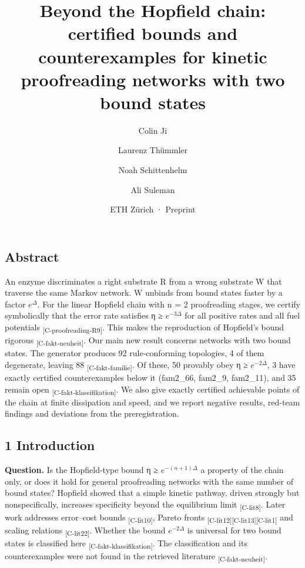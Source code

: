 \documentclass[
  english,
  twocolumn,
  10pt]{article}
\title{Beyond the Hopfield chain: certified bounds and counterexamples
for kinetic proofreading networks with two bound states}
\author{Colin Ji \and Laurenz Thümmler \and Noah Schittenhelm \and Ali
Suleman}
\date{ETH Zürich · Preprint}
\begin{document}
\maketitle

\subsection{Abstract}\label{abstract}

An enzyme discriminates a right substrate R from a wrong substrate W
that traverse the same Markov network. W unbinds from bound states
faster by a factor \(e^{\Delta}\). For the linear Hopfield chain with n
= 2 proofreading stages, we certify symbolically that the error rate
satisfies η ≥ \(e^{-3\Delta}\) for all positive rates and all fuel
potentials \textsubscript{[C-proofreading-R9]}. This makes the
reproduction of Hopfield's bound rigorous
\textsubscript{[C-fakt-neuheit]}. Our main new result concerns networks
with two bound states. The generator produces 92 rule-conforming
topologies, 4 of them degenerate, leaving 88
\textsubscript{[C-fakt-familie]}. Of these, 50 provably obey η ≥
\(e^{-2\Delta}\), 3 have exactly certified counterexamples below it
(fam2\_66, fam2\_9, fam2\_11), and 35 remain open
\textsubscript{[C-fakt-klassifikation]}. We also give exactly certified
achievable points of the chain at finite dissipation and speed, and we
report negative results, red-team findings and deviations from the
preregistration.

\subsection{1 Introduction}\label{introduction}

\textbf{Question.} Is the Hopfield-type bound η ≥ \(e^{-(n+1)\Delta}\) a
property of the chain only, or does it hold for general proofreading
networks with the same number of bound states? Hopfield showed that a
simple kinetic pathway, driven strongly but nonspecifically, increases
specificity beyond the equilibrium limit \textsubscript{[C-lit8]}. Later
work addresses error--cost bounds \textsubscript{[C-lit10]}, Pareto
fronts
\textsubscript{[C-lit12]}\textsubscript{[C-lit13]}\textsubscript{[C-lit1]}
and scaling relations \textsubscript{[C-lit22]}. Whether the bound
\(e^{-2\Delta}\) is universal for two bound states is classified here
\textsubscript{[C-fakt-klassifikation]}. The classification and its
counterexamples were not found in the retrieved literature
\textsubscript{[C-fakt-neuheit]}.
\end{document}
